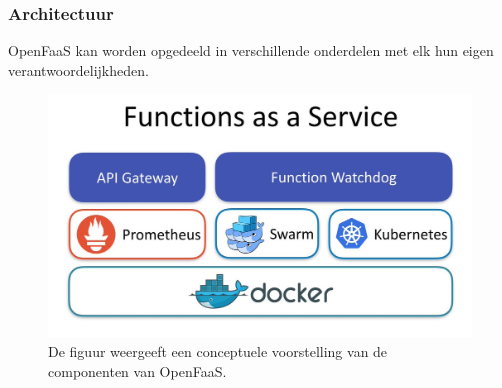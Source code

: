 \subsubsection{Architectuur}
OpenFaaS kan worden opgedeeld in verschillende onderdelen met elk hun eigen verantwoordelijkheden.
\begin{figure}
    \includegraphics[width=1\textwidth]{img/open-faas.jpg}
    \caption{De figuur weergeeft een conceptuele voorstelling van de componenten van OpenFaaS. \autocite{Ellis2019}}
    \label{fig:open-faas-conceptueel}  
\end{figure}


